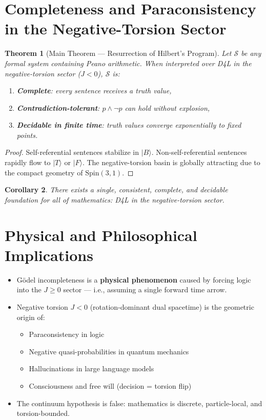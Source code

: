\documentclass[dvipdfmx,11pt,a4paper]{article}
\newtheorem{theorem}{Theorem}[section]
\newtheorem{corollary}[theorem]{Corollary}
\theoremstyle{definition}
\begin{document}
\section{Completeness and Paraconsistency in the Negative-Torsion Sector}

\begin{theorem}[Main Theorem — Resurrection of Hilbert's Program]
Let $\mathcal{S}$ be any formal system containing Peano arithmetic. When interpreted over D4L in the negative-torsion sector ($J<0$), $\mathcal{S}$ is:
\begin{enumerate}
\item \textbf{Complete}: every sentence receives a truth value,
\item \textbf{Contradiction-tolerant}: $p \wedge \neg p$ can hold without explosion,
\item \textbf{Decidable in finite time}: truth values converge exponentially to fixed points.
\end{enumerate}
\end{theorem}

\begin{proof}
Self-referential sentences stabilize in $\vert B\rangle$. Non-self-referential sentences rapidly flow to $\vert T\rangle$ or $\vert F\rangle$. The negative-torsion basin is globally attracting due to the compact geometry of $\mathrm{Spin}(3,1)$.
\end{proof}

\begin{corollary}
There exists a single, consistent, complete, and decidable foundation for all of mathematics: D4L in the negative-torsion sector.
\end{corollary}

\section{Physical and Philosophical Implications}

\begin{itemize}
\item Gödel incompleteness is a \textbf{physical phenomenon} caused by forcing logic into the $J\geq0$ sector — i.e., assuming a single forward time arrow.
\item Negative torsion $J<0$ (rotation-dominant dual spacetime) is the geometric origin of:
  \begin{itemize}
  \item Paraconsistency in logic
  \item Negative quasi-probabilities in quantum mechanics
  \item Hallucinations in large language models
  \item Consciousness and free will (decision = torsion flip)
  \end{itemize}
\item The continuum hypothesis is false: mathematics is discrete, particle-local, and torsion-bounded.
\end{itemize}
\end{document}
